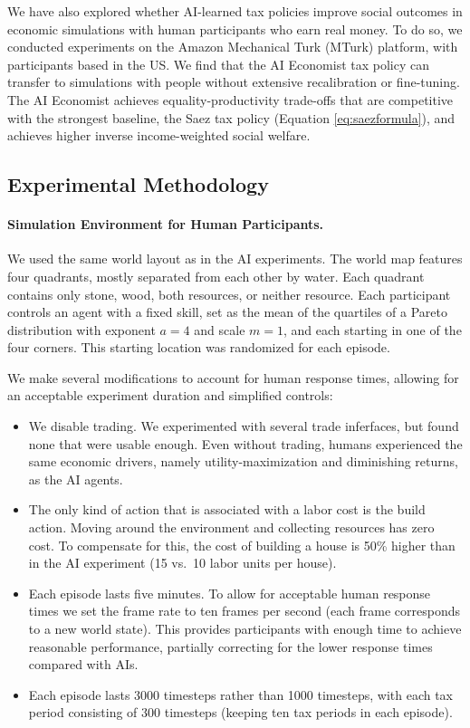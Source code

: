 We have also explored whether AI-learned tax policies improve social outcomes in economic simulations with human participants who earn real money.
To do so, we conducted experiments on the Amazon Mechanical Turk (MTurk) platform, with participants based in the US.
We find that the AI Economist tax policy can  transfer to simulations with people  without extensive recalibration or fine-tuning. The AI Economist achieves equality-productivity trade-offs that are competitive with the strongest baseline, the Saez tax policy (Equation \ref{eq:saezformula}), and achieves higher inverse income-weighted social welfare.

\subsection{Experimental Methodology}
\paragraph{Simulation Environment for Human Participants.}
We used the same world layout as in the AI experiments. The world map features four quadrants, mostly separated from each other by water. Each quadrant contains only stone, wood, both resources, or neither resource.
Each participant controls an agent with a fixed skill, set as the mean of the quartiles of a Pareto distribution with exponent $a=4$ and scale $m=1$, and each starting in one of the four corners. This starting location was randomized for each episode.

We make several modifications to account for human response times, allowing  for an acceptable experiment duration and simplified controls:
\begin{itemize}
 \item We disable trading. We experimented with several trade inferfaces, but found none that were usable enough. Even without trading, humans experienced the same economic drivers, namely utility-maximization and diminishing returns, as the AI agents.
 \item The only kind of action that is associated with a labor cost is the  build action. Moving around the environment and collecting resources has zero cost. To compensate for this, the cost of building a house is 50\% higher than in the AI experiment (15 vs.~10 labor units per house).
 \item Each episode lasts five minutes. To allow for acceptable human response times we set the frame rate to ten frames per second (each frame corresponds to a new world state).
 This provides participants with enough time to achieve reasonable performance, partially correcting for the lower response times compared with AIs.
 \item Each episode lasts 3000 timesteps rather than 1000 timesteps, with each tax period consisting of $300$ timesteps (keeping ten tax periods in each episode).
\end{itemize}
